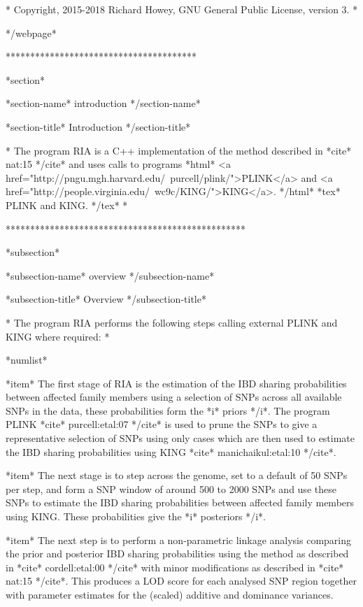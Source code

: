 *
Copyright, 2015-2018 Richard Howey, GNU General Public License, version 3.
*

*/webpage*

***************************************

*section*

*section-name* introduction */section-name*

*section-title* Introduction */section-title*

*
The program RIA is a C++ implementation of the method described in *cite* nat:15 */cite* and uses calls to programs *html* <a href="http://pngu.mgh.harvard.edu/~purcell/plink/">PLINK</a> and <a href="http://people.virginia.edu/~wc9c/KING/">KING</a>. */html* *tex* PLINK and KING. */tex*
*

*************************************************


*subsection*

*subsection-name*
overview
*/subsection-name*

*subsection-title*
Overview
*/subsection-title*

*
The program RIA performs the following steps calling external PLINK and KING where required:
*

*numlist*

*item*
The first stage of RIA is the estimation of the IBD sharing probabilities between affected family members using a selection of SNPs across all available SNPs in the data, these probabilities form the *i* priors */i*. The program PLINK *cite* purcell:etal:07 */cite* is used to prune the SNPs to give a representative selection of SNPs using only cases which are then used to estimate the IBD sharing probabilities using KING *cite* manichaikul:etal:10 */cite*.


*item*
The next stage is to step across the genome, set to a default of 50 SNPs per step, and form a SNP window of around 500 to 2000 SNPs and use these SNPs to estimate the IBD sharing probabilities between affected family members using KING. These probabilities give the *i* posteriors */i*.

*item*
The next step is to perform a non-parametric linkage analysis comparing the prior and posterior IBD sharing probabilities using the method as described in *cite* cordell:etal:00 */cite* with minor modifications as described in *cite* nat:15 */cite*. This produces a LOD score for each analysed SNP region together with parameter estimates for the (scaled) additive and dominance variances.

